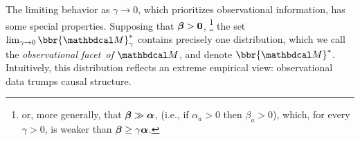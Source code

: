 \documentclass[twoside]{article}
\newcommand\obslimit{observational facet} %
\begin{document}
The limiting behavior as $\gamma \to 0$, which prioritizes observational information, has some special properties.
Supposing that $\boldsymbol\beta > \mathbf{0}$,%
    \footnote{or, more generally, that $\boldsymbol\beta \gg \boldsymbol\alpha$,
        (i.e., if $\alpha_a>0$ then $\beta_a>0$), 
        which, for every $\gamma > 0$, is weaker than $\boldsymbol\beta \ge \gamma \boldsymbol\alpha$. }
the set $\lim_{\gamma\to 0}\bbr{\dg M}_\gamma^*$ contains precisely one
distribution, which we call the \emph{\obslimit\ of $\dg M$}, and denote $\bbr{\dg M}^*$.
Intuitively, this distribution
reflects an extreme empirical
view: observational data trumps causal structure.
\end{document}
